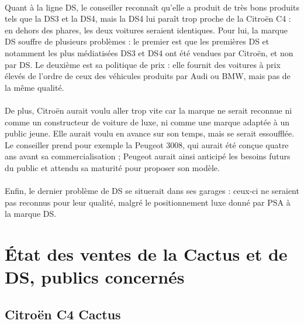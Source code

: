 \documentclass[12pt]{article}\usepackage[]{graphicx}\usepackage[]{color}
\begin{document}
\paragraph{} Quant à la ligne DS, le conseiller reconnaît qu'elle a produit de très bons
produits tels que la DS3 et la DS4, mais la DS4 lui paraît trop proche de la Citroën
C4 : en dehors des phares, les deux voitures seraient identiques.
Pour lui, la marque DS souffre de plusieurs problèmes : le premier est que les
premières DS et notamment les plus médiatisées DS3 et DS4 ont été vendues par
Citroën, et non par DS. Le deuxième est sa politique de prix : elle fournit des
voitures à prix élevés de l'ordre de ceux des véhicules produits par Audi ou BMW,
mais pas de la même qualité.

\paragraph{} De plus, Citroën aurait voulu aller trop vite car la marque ne serait
reconnue ni comme un constructeur de voiture de luxe, ni comme une marque adaptée
à un public jeune. Elle aurait voulu en avance sur son temps, mais se serait essoufflée.
Le conseiller prend pour exemple la Peugeot 3008, qui aurait été conçue quatre ans
avant sa commercialisation ; Peugeot aurait ainsi anticipé les besoins futurs du public
et attendu sa maturité pour proposer son modèle.

\paragraph{} Enfin, le dernier problème de DS se situerait dans ses garages :
ceux-ci ne seraient pas reconnus pour leur qualité, malgré le positionnement
luxe donné par PSA à la marque DS.

\section{État des ventes de la Cactus et de DS, publics concernés}

\subsection{Citroën C4 Cactus}
\end{document}
